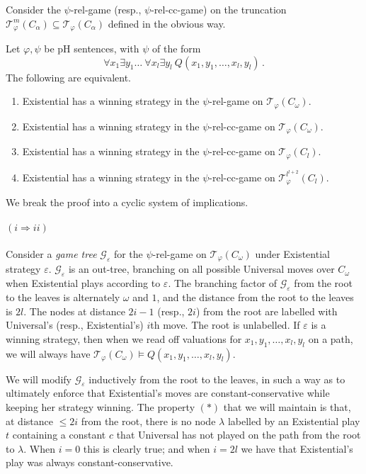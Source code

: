 \documentclass{LMCS}
\begin{document}
Consider the $\psi$-rel-game (resp., $\psi$-rel-cc-game) on the truncation $\mathcal{T}^{m}_\varphi(C_\alpha) \subseteq \mathcal{T}_\varphi(C_\alpha)$ defined in the obvious way.
\begin{prop}
\label{prop:cc}
Let $\varphi,\psi$ be pH sentences, with $\psi$ of the form 
\[\forall x_1 \exists y_1 \ldots\ \forall x_l \exists y_l \ Q(x_1,y_1,\ldots,x_l,y_l)\,.\]
 The following are equivalent.
  \begin{enumerate}[label=(\roman*)]
\item  Existential has a winning strategy in the $\psi$-rel-game on $\mathcal{T}_\varphi(C_\omega)$.
\item  Existential has a winning strategy in the $\psi$-rel-cc-game on $\mathcal{T}_\varphi(C_\omega)$.
\item Existential has a winning strategy in the $\psi$-rel-cc-game on $\mathcal{T}_\varphi(C_l)$.
\item Existential has a winning strategy in the $\psi$-rel-cc-game on $\mathcal{T}^{l^{l+2}}_\varphi(C_l)$.
\end{enumerate}
\end{prop}
\proof We break the proof into a cyclic system of implications.
\paragraph{$(i \Rightarrow ii)$}
Consider a \emph{game tree} $\mathscr{G}_\varepsilon$ for the $\psi$-rel-game on $\mathcal{T}_\varphi(C_\omega)$ under Existential strategy $\varepsilon$. $\mathscr{G}_\varepsilon$ is an out-tree, branching on all possible Universal moves over $C_\omega$ when Existential plays according to $\varepsilon$. The branching factor of $\mathscr{G}_\varepsilon$ from the root to the leaves is alternately $\omega$ and $1$, and the distance from the root to the leaves is $2l$. The nodes at distance $2i-1$ (resp., $2i$) from the root are labelled with Universal's (resp., Existential's) $i$th move. The root is unlabelled. If $\varepsilon$ is a winning strategy, then when we read off valuations for $x_1,y_1,\ldots,x_l,y_l$ on a path, we will always have $\mathcal{T}_\varphi(C_\omega) \models Q(x_1,y_1,\ldots,x_l,y_l)$.

We will modify $\mathscr{G}_\varepsilon$ inductively from the root to the leaves, in such a way as to ultimately enforce that Existential's moves are constant-conservative while keeping her strategy winning. The property $(*)$ that we will maintain is that, at distance $\leq 2i$ from the root, there is no node $\lambda$ labelled by an Existential play $t$ containing a constant $c$ that Universal has not played on the path from the root to $\lambda$. When $i=0$ this is clearly true; and when $i=2l$ we have that Existential's play was always constant-conservative. 
\end{document}
